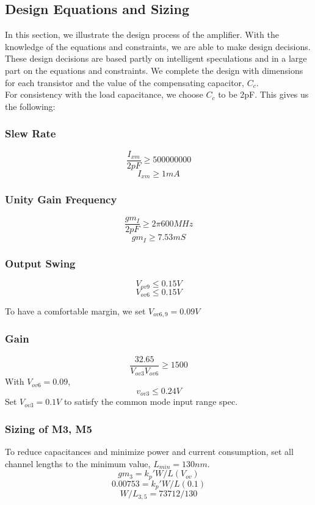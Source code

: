 \documentclass[]{article}
\begin{document}
		\subsection{Design Equations and Sizing}
			In this section, we illustrate the design process of the amplifier. With the knowledge of the equations and constraints, we are able to make design decisions. These design decisions are based partly on intelligent speculations and in a large part on the equations and constraints. We complete the design with dimensions for each transistor and the value of the compensating capacitor, $C_{c}$.
			$$$$
			For consistency with the load capacitance, we choose $C_{c}$ to be 2pF. This gives us the following:
			\subsubsection{Slew Rate}
				$$\frac{I_{xm}}{2pF} \ge 500 000 000 $$
				$$I_{xm} \ge 1mA$$
		
			\subsubsection{Unity Gain Frequency}
				$$\frac{gm_{I}}{2pF} \ge 2\pi 600 MHz $$
				$$gm_{I} \ge 7.53mS$$
		
			\subsubsection{Output Swing}
			$$V_{ov9} \le 0.15V$$
			$$V_{ov6} \le 0.15V$$

			To have a comfortable margin, we set $V_{ov6,9} = 0.09 V$	
		
			\subsubsection{Gain}
				$$\frac{32.65}{V_{ov3}V_{ov6}} \ge 1500$$
				With $V_{ov6} = 0.09$,
				$$v_{ov3} \le 0.24 V $$
				Set $V_{ov3} = 0.1V$ to satisfy the common mode input range spec.
				$$$$

				\pagebreak
		
			\subsubsection{Sizing of M3, M5}
				To reduce capacitances and minimize power and current consumption, set all channel lengths to the minimum value, $L_{min} = 130 nm$.
				$$ gm_{3} = k_{p}'W/L(V_{ov}) $$
				$$ 0.00753 = k_{p}'W/L(0.1) $$
				$$ W/L_{3,5} = 73712/130 $$
			
\end{document}
